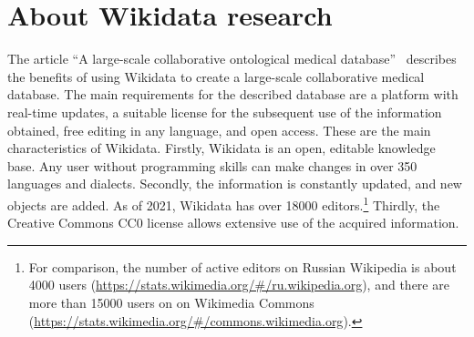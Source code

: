 \section{About Wikidata research}
The article ``A large-scale collaborative ontological medical database''~ describes the benefits of using Wikidata to create a large-scale collaborative medical database. The main requirements for the described database are a platform with real-time updates, a suitable license for the subsequent use of the information obtained, free editing in any language, and open access. These are the main characteristics of Wikidata. Firstly, Wikidata is an open, editable knowledge base. Any user without programming skills can make changes in over 350 languages and dialects. Secondly, the information is constantly updated, and new objects are added. As of 2021, Wikidata has over \num{18000} editors.\footnote{For comparison, the number of active editors on Russian Wikipedia
is about \num{4000} users (\href{https://stats.wikimedia.org/\#/ru.wikipedia.org}{https://stats.wikimedia.org/\#/ru.wikipedia.org}), and there are more than \num{15000} users on on Wikimedia Commons (\href{https://stats.wikimedia.org/\#/commons.wikimedia.org}{https://stats.wikimedia.org/\#/commons.wikimedia.org}).} Thirdly, the Creative Commons CC0 license allows extensive use of the acquired information.

